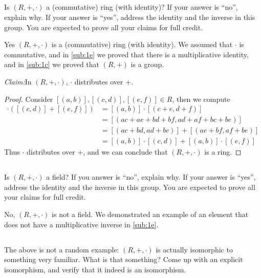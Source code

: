 \documentclass[10pt]{armath}
\newenvironment{claim}[1]{\par\noindent\textit{Claim:}\space#1}{}
\begin{document}
\subsection{}%
\label{sub:1f}

Is $(R,+,\cdot)$ a (commutative) ring (with identity)? If your answer is
``no'', explain why. If your answer is ``yes'', address the identity and the
inverse in this group. You are expected to prove all your claims for full
credit.

Yes $(R,+,\cdot)$ is a (commutative) ring (with identity). We assumed that
$\cdot$ is commutative, and in \ref{sub:1e} we proved that there is a
multiplicative identity, and in \ref{sub:1c} we proved that $(R,+)$ is a group.
\begin{claim}
  In $(R,+,\cdot)$, $\cdot$ distributes over $+$.
\end{claim}
\begin{proof}
  Consider $[(a,b)],[(c,d)],[(e,f)]\in R$, then we compute
  \begin{align*}
    [(a,b)]\cdot\left([(c,d)]+[(e,f)]\right)&=[(a,b)]\cdot[(c+e,d+f)]\\
    &=[(ac+ae+bd+bf,ad+af+bc+be)]\\
    &=[(ac+bd,ad+bc)]+[(ae+bf,af+be)]\\
    &=[(a,b)]\cdot[(c,d)]+[(a,b)]\cdot[(e,f)]
  \end{align*}
  Thus $\cdot$ distributes over $+$, and we can conclude that $(R,+,\cdot)$ is
  a ring.
\end{proof}

\subsection{}%
\label{sub:1g}

Is $(R,+,\cdot)$ a field? If you answer is ``no'', explain why. If your answer
is ``yes'', address the identity and the inverse in this group. You are
expected to prove all your claims for full credit.

No, $(R,+,\cdot)$ is not a field. We demonstrated an example of an element that
does not have a multiplicative inverse in \ref{sub:1e}.

\subsection{}%
\label{sub:1h}

The above is not a random example: $(R,+,\cdot)$ is actually isomorphic to
something very familiar. What is that something? Come up with an explicit
isomorphism, and verify that it indeed is an isomorphism.
\end{document}
